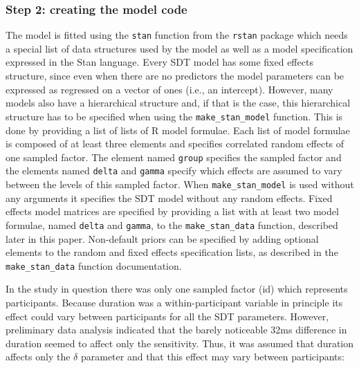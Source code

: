 \documentclass[oneside,a4paper]{article}
\begin{document}
\subsubsection{Step 2: creating the model code}

The model is fitted using the \texttt{stan} function from the
\texttt{rstan} package which needs a special list of data structures
used by the model as well as a model specification expressed in the
Stan language. Every SDT model has some fixed effects structure, since
even when there are no predictors the model parameters can be
expressed as regressed on a vector of ones (i.e., an
intercept). However, many models also have a hierarchical structure
and, if that is the case, this hierarchical structure has to be
specified when using the \texttt{make\_stan\_model} function. This is
done by providing a list of lists of R model formulae. Each list of
model formulae is composed of at least three elements and specifies
correlated random effects of one sampled factor. The element named
\texttt{group} specifies the sampled factor and the elements named
\texttt{delta} and \texttt{gamma} specify which effects are assumed to
vary between the levels of this sampled factor. %
%
When \texttt{make\_stan\_model} is used without any arguments it
specifies the SDT model without any random effects. Fixed effects
model matrices are specified by providing a list with at least two
model formulae, named \texttt{delta} and \texttt{gamma}, to the
\texttt{make\_stan\_data} function, described later in this
paper. Non-default priors can be specified by adding optional elements
to the random and fixed effects specification lists, as described in
the \texttt{make\_stan\_data} function documentation.

In the study in question there was only one sampled factor (id) which
represents participants. Because duration was a within-participant
variable in principle its effect could vary between participants for
all the SDT parameters. However, preliminary data analysis indicated
that the barely noticeable 32ms difference in duration seemed to
affect only the sensitivity. Thus, it was assumed that duration
affects only the $\delta$ parameter and that this effect may vary
between participants:
\end{document}

